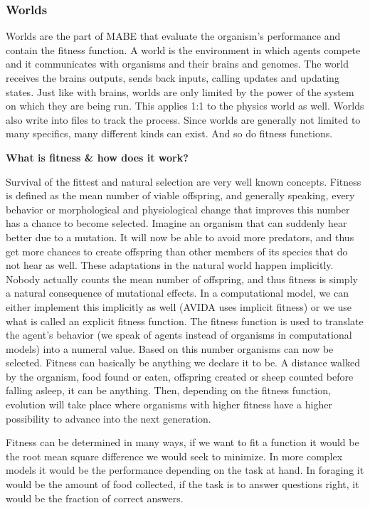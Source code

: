 \documentclass[12pt,oneside,listof=totoc,paper=a4,headings=small]{scrbook}
\begin{document}
\newpage

\subsubsection{Worlds}
Worlds are the part of MABE that evaluate the organism's performance and contain the fitness function. A world is the environment in which agents compete and it communicates with organisms and their brains and genomes. The world receives the brains outputs, sends back inputs, calling updates and updating states. Just like with brains, worlds are only limited by the power of the system on which they are being run. This applies 1:1 to the physics world as well. Worlds also write into files to track the process. 
Since worlds are generally not limited to many specifics, many different kinds can exist. And so do  fitness functions.

\textbf{What is fitness \& how does it work?} 

Survival of the fittest and natural selection are very well known concepts. Fitness is defined as the mean number of viable offspring, and generally speaking, every behavior or morphological and physiological change that improves this number has a chance to become selected. Imagine an organism that can suddenly hear better due to a mutation. It will now be able to avoid more predators, and thus get more chances to create offspring than other members of its species that do not hear as well. These adaptations in the natural world happen implicitly. Nobody actually counts the mean number of offspring, and thus fitness is simply a natural consequence of mutational effects. In a computational model, we can either implement this implicitly as well (AVIDA uses implicit fitness) or we use what is called an explicit fitness function. The fitness function is used to translate the agent's behavior (we speak of agents instead of organisms in computational models) into a numeral value. Based on this number organisms can now be selected. Fitness can basically be anything we declare it to be. A distance walked by the organism, food found or eaten, offspring created or sheep counted before falling asleep, it can be anything. Then, depending on the fitness function, evolution will take place where organisms with higher fitness have a higher possibility to advance into the next generation.

Fitness can be determined in many ways, if we want to fit a function it would be the root mean square difference we would seek to minimize. In more complex models it would be the performance depending on the task at hand. In foraging it would be the amount of food collected, if the task is to answer questions right, it would be the fraction of correct answers.  
\end{document}
